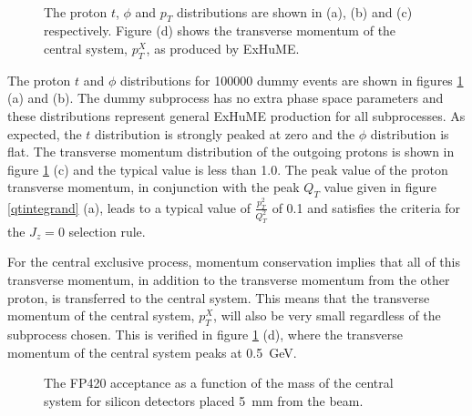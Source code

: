 \begin{figure} 
\centering
\mbox{
	\quad
	}
	\mbox{
	\quad
	}
\caption[The proton $t$, $\phi$ and $p_T$ distributions and the transverse momentum of the central system as produced by ExHuME]{ The proton $t$, $\phi$ and $p_T$ distributions are shown in (a), (b) and (c) respectively. Figure (d) shows the transverse momentum of the central system, $p_T^X$, as produced by ExHuME.\label{protonpt}}
\end{figure}

The proton $t$ and $\phi$ distributions for 100000 dummy events are shown in figures \ref{protonpt} (a) and (b). The dummy subprocess has no extra phase space parameters and these distributions represent general ExHuME production for all subprocesses. As expected, the $t$ distribution is strongly peaked at zero and the $\phi$ distribution is flat. 
The transverse momentum distribution of the outgoing protons is shown in figure \ref{protonpt} (c)
and the typical value is less than 1.0. 
The peak value of the proton transverse momentum, in conjunction with the peak $Q_T$ value given in figure \ref{qtintegrand} (a), leads to a typical value of $\frac{p_T^2}{Q_T^2}$ of 0.1 and satisfies the criteria for the $J_z=0$ selection rule. 

For the central exclusive process, momentum conservation implies that all of this transverse momentum, in addition to the transverse momentum from the other proton, is transferred to the central system. 
This means that the transverse momentum of the central system, $p_T^X$, will also be very small regardless of the subprocess chosen. This is verified in figure \ref{protonpt} (d), where the transverse momentum of the central system peaks at 0.5~GeV. 



\begin{figure} 
\centering
\caption[Reproduced FP420 acceptance as a function of central system mass]{The FP420 acceptance as a function of the mass of the central system for silicon detectors placed 5~mm from the beam. \label{fp420acceptance}}
\end{figure}

